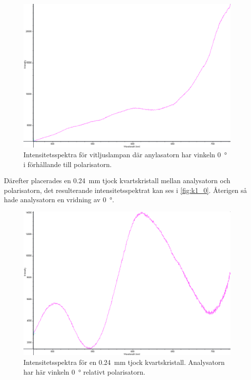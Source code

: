 \documentclass[a4paper]{article}
\begin{document}
\begin{figure}[ht!]
	\centering
	\includegraphics[width=\linewidth]{data/spektra_fritt_inv}
	\caption{Intensitetsspektra för vitljuslampan där anylasatorn har vinkeln \SI{0}{\degree} i förhållande till polarisatorn.}
	\label{fig:fritt}
\end{figure}
\FloatBarrier

\FloatBarrier
Därefter placerades en \SI{0.24}{\milli\m} tjock kvartskristall mellan analysatorn och polarisatorn, det resulterande intensitetsspektrat kan ses i \autoref{fig:k1_0}. Återigen så hade analysatorn en vridning av \SI{0}{\degree}.

\begin{figure}[ht!]
	\centering
	\includegraphics[width=\linewidth]{data/spektra_180_kristall1_180_inv}
	\caption{Intensitetsspektra för en \SI{0.24}{\milli\m} tjock kvartskristall. Analysatorn har här vinkeln \SI{0}{\degree} relativt polarisatorn.}
	\label{fig:k1_0}
\end{figure}
\FloatBarrier
\end{document}
